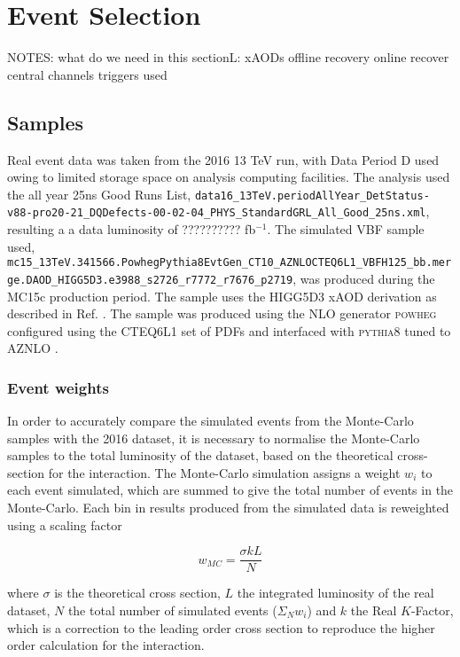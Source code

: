 \chapter{Event Selection}\label{c:ES}

NOTES:
what do we need in this sectionL:
	xAODs
	offline recovery 
	online recover
	central channels
	triggers used
	
	
	\section{Samples}
		 Real event data was taken from the 2016 13 TeV run, with Data Period D used owing to limited storage space on analysis computing facilities. The analysis used the all year 25ns Good Runs List, \verb|data16_13TeV.periodAllYear_DetStatus-v88-pro20-21_DQDefects-00-02-04_PHYS_StandardGRL_All_Good_25ns.xml|, resulting a a data luminosity of ?????????? fb$^{-1}$. The simulated VBF sample used, \verb|mc15_13TeV.341566.PowhegPythia8EvtGen_CT10_AZNLOCTEQ6L1_VBFH125_bb.merge.DAOD_HIGG5D3.e3988_s2726_r7772_r7676_p2719|, was produced during the MC15c production period. The sample uses the HIGG5D3 xAOD derivation as described in Ref. \cite{HIGG5D3}. The sample was produced using the NLO generator \textsc{powheg} configured using the CTEQ6L1 \cite{CTEQ} set of PDFs and interfaced with \textsc{pythia8} tuned to AZNLO \cite{AZNLO}.
		 
		 
		 \subsection{Event weights}
		 
			 In order to accurately compare the simulated events from the Monte-Carlo samples with the 2016 dataset, it is necessary to normalise the Monte-Carlo samples to the total luminosity of the dataset, based on the theoretical cross-section for the interaction. The Monte-Carlo simulation assigns a weight $w_i$ to each event simulated, which are summed to give the total number of events in the Monte-Carlo. Each bin in results produced from the simulated data is reweighted using a scaling factor
			 
			 \begin{equation}
			 w_{MC} = \frac{\sigma k L}{N}
			 \end{equation}
			 
			 where $\sigma$ is the theoretical cross section, $L$ the integrated luminosity of the real dataset, $N$ the total number of simulated events ($\Sigma_N w_i$) and $k$ the Real $K$-Factor, which is a correction to the leading order cross section to reproduce the higher order calculation for the interaction.  
		 
